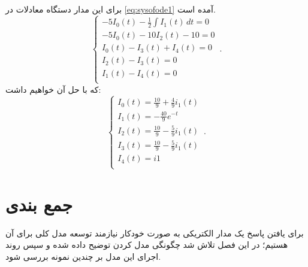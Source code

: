 برای این مدار دستگاه معادلات در
\ref{eq:sysofode1}
آمده است.
\begin{equation}
	\label{eq:sysofode1}
	\begin{cases}
		-5I_0(t) - \frac{1}{2} \int I_1(t) \,dt = 0\\
		-5I_0(t) - 10I_2(t) - 10 = 0\\
		I_0(t) - I_3(t) + I_4(t) = 0\\
		I_2(t) - I_3(t) = 0\\
		I_1(t)  - I_4(t) = 0\\
	\end{cases}\,.
\end{equation}
که با حل آن خواهیم داشت:
\begin{equation}
	\label{eq:sysofode1}
	\begin{cases}
		I_0(t) = \frac{10}{9} + \frac{4}{9}i_1(t)\\
		I_1(t) = -\frac{40}{9} e^{-t}\\
		I_2(t) = \frac{10}{9} - \frac{5}{9}i_1(t)\\
		I_3(t) = \frac{10}{9} - \frac{5}{9}i_1(t)\\
		I_4(t) = i1\\
	\end{cases}\,.
\end{equation}

\section{جمع بندی}
برای یافتن پاسخ یک مدار الکتریکی به صورت خودکار نیازمند توسعه مدل کلی برای آن هستیم؛
در این فصل تلاش شد چگونگی مدل کردن توضیح داده شده و سپس روند اجرای این مدل بر چندین نمونه بررسی شود.